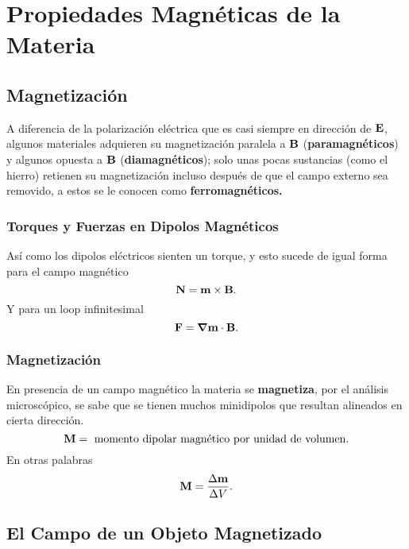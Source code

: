 \chapter{Propiedades Magnéticas de la Materia}
\section{Magnetización}
A diferencia de la polarización eléctrica que es casi siempre en dirección de $\vb{E}$, algunos materiales adquieren su magnetización paralela a $\vb{B}$ (\textbf{paramagnéticos}) y algunos opuesta a $\vb{B}$ (\textbf{diamagnéticos}); solo unas pocas sustancias (como el hierro) retienen su magnetización incluso después de que el campo externo sea removido, a estos se le conocen como \textbf{ferromagnéticos.}

\subsection{Torques y Fuerzas en Dipolos Magnéticos}
Así como los dipolos eléctricos sienten un torque, y esto sucede de igual forma para el campo magnético
\begin{equation}
	\vb{N} = \vb{m} \times \vb{B}.
\end{equation}
Y para un loop infinitesimal
\begin{equation}
	\vb{F} = \grad{\vb{m} \cdot \vb{B}}.
\end{equation}


\subsection{Magnetización}
En presencia de un campo magnético la materia se \textbf{magnetiza}, por el análisis microscópico, se sabe que se tienen muchos minidipolos que resultan alineados en cierta dirección.
\begin{equation}
	\vb{M} = \text{ momento dipolar magnético por unidad de volumen.}
\end{equation}
En otras palabras
\begin{equation}
	\vb{M} = \frac{\Delta \vb{m}}{\Delta V}.
\end{equation}



\section{El Campo de un Objeto Magnetizado}
